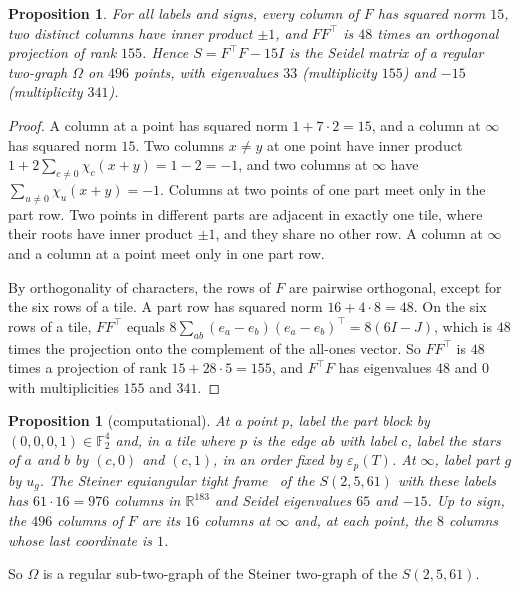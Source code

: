 \documentclass[11pt]{amsart}
\newtheorem{proposition}[theorem]{Proposition}
\theoremstyle{remark}
\newcommand{\F}{\mathbb{F}}
\newcommand{\R}{\mathbb{R}}
\begin{document}
\begin{proposition}\label{prop:frame}
For all labels and signs, every column of $F$ has squared norm $15$, two distinct columns have inner product $\pm1$, and $FF^{\top}$ is $48$ times an orthogonal projection of rank $155$. Hence $S=F^{\top}F-15I$ is the Seidel matrix of a regular two-graph $\Omega$ on $496$ points, with eigenvalues $33$ (multiplicity $155$) and $-15$ (multiplicity $341$).
\end{proposition}

\begin{proof}
A column at a point has squared norm $1+7\cdot2=15$, and a column at $\infty$ has squared norm $15$. Two columns $x\ne y$ at one point have inner product $1+2\sum_{c\ne0}\chi_c(x+y)=1-2=-1$, and two columns at $\infty$ have $\sum_{u\ne0}\chi_u(x+y)=-1$. Columns at two points of one part meet only in the part row. Two points in different parts are adjacent in exactly one tile, where their roots have inner product $\pm1$, and they share no other row. A column at $\infty$ and a column at a point meet only in one part row.

By orthogonality of characters, the rows of $F$ are pairwise orthogonal, except for the six rows of a tile. A part row has squared norm $16+4\cdot8=48$. On the six rows of a tile, $FF^{\top}$ equals $8\sum_{ab}(e_a-e_b)(e_a-e_b)^{\top}=8(6I-J)$, which is $48$ times the projection onto the complement of the all-ones vector. So $FF^{\top}$ is $48$ times a projection of rank $15+28\cdot5=155$, and $F^{\top}F$ has eigenvalues $48$ and $0$ with multiplicities $155$ and $341$.
\end{proof}

\begin{proposition}[computational]\label{prop:steinerhalf}
At a point $p$, label the part block by $(0,0,0,1)\in\F_2^4$ and, in a tile where $p$ is the edge $ab$ with label $c$, label the stars of $a$ and $b$ by $(c,0)$ and $(c,1)$, in an order fixed by $\varepsilon_p(T)$. At $\infty$, label part $g$ by $u_g$. The Steiner equiangular tight frame~\cite{FMT12} of the $S(2,5,61)$ with these labels has $61\cdot16=976$ columns in $\R^{183}$ and Seidel eigenvalues $65$ and $-15$. Up to sign, the $496$ columns of $F$ are its $16$ columns at $\infty$ and, at each point, the $8$ columns whose last coordinate is $1$.
\end{proposition}

So $\Omega$ is a regular sub-two-graph of the Steiner two-graph of the $S(2,5,61)$.
\end{document}
